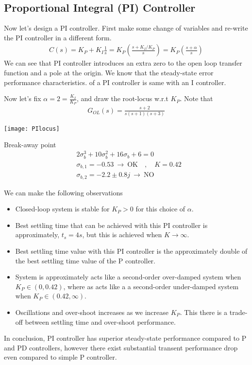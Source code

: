 \documentclass[twoside]{article}
\begin{document}
\subsection{Proportional Integral (PI) Controller}

Now let's design a PI controller. First make some change of
variables and re-write the PI controller in a different form.
%
\begin{align*}
 C(s) = K_P + K_I \frac{1}{s} = K_P \left( \frac{ s + K_I / K_P }{s}
  \right) = K_P \left( \frac{ s + \alpha }{s} \right)
\end{align*}
%
We can see that PI controller introduces an extra zero to the
open loop transfer function and a pole at the origin. 
We know that the steady-state error performance characteristics. 
of a PI controller is same with an I controller. 

Now let's fix $\alpha = 2 = \frac{K_I}{K_P}$, and draw 
the root-locus w.r.t $K_P$. Note that 
%
\begin{align*}
  G_{OL}(s) = \frac{s+2}{s (s+1) (s+3)}
\end{align*}


\begin{minipage}[h]{0.5\linewidth}
    \begin{center}
      \texttt{[image: PIlocus]}
    \end{center}
\end{minipage}
\begin{minipage}[h]{0.5\linewidth}
	Break-away point
	\begin{align*}
	& 2 \sigma_{b}^3 + 10 \sigma_{b}^2 + 16 \sigma_b + 6 = 0 
	\\
	& \sigma_{b,1} = - 0.53  \ \rightarrow \ \mathrm{OK} \quad ,
          \quad K = 0.42
	\\
	& \sigma_{b,2} =  -2.2 \pm 0.8 j \ \rightarrow \ \mathrm{NO}
	\end{align*}
\end{minipage}

We can make the following observations
%
\begin{itemize}
 \item Closed-loop system is stable for $K_P > 0$ for this choice of
   $\alpha$. 
  \item Best settling time that can be achieved with this PI controller
    is approximately, $t_{s} = 4 s$, but this is achieved when $K \to
    \infty$.
  \item Best settling time value with this PI controller is the
    approximately double of the best settling time value of the
    P controller.
  \item System is approximately acts like a second-order over-damped
   system when $K_P \in (0,0.42)$, where as acts like a a second-order 
   under-damped system when $K_P \in (0.42,\infty)$. 
   \item Oscillations and over-shoot increases as we increase $K_P$. 
   This there is a trade-off between settling time and over-shoot
   performance. 
\end{itemize}
% 
In conclusion, PI controller has superior steady-state performance
compared to P and PD controllers, however there exist substantial 
transent performance drop even compared to simple P controller. 
\end{document}
